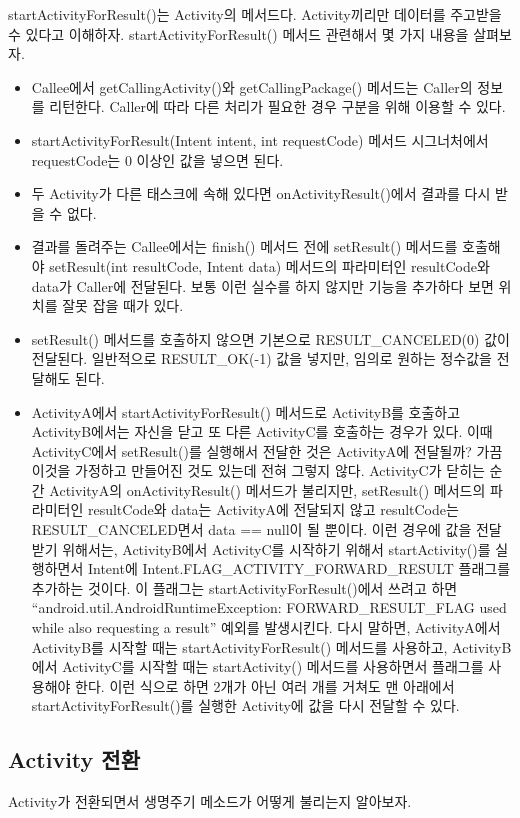 startActivityForResult()는 Activity의 메서드다. Activity끼리만 데이터를 주고받을 수 있다고 이해하자. 
startActivityForResult() 메서드 관련해서 몇 가지 내용을 살펴보자.
\begin{itemize} 
\item Callee에서 getCallingActivity()와 getCallingPackage() 메서드는 Caller의 정보를 리턴한다. Caller에 따라 다른 처리가 필요한 경우 구분을 위해 이용할 수 있다. 
\item startActivityForResult(Intent intent, int requestCode) 메서드 시그너처에서  requestCode는 0 이상인 값을 넣으면 된다.
\item 두 Activity가 다른 태스크에 속해 있다면 onActivityResult()에서 결과를 다시 받을 수 없다.
\item 결과를 돌려주는 Callee에서는 finish() 메서드 전에 setResult() 메서드를 호출해야 setResult(int resultCode, Intent data) 메서드의 파라미터인 resultCode와 data가 Caller에 전달된다. 보통 이런 실수를 하지 않지만 기능을 추가하다 보면 위치를 잘못 잡을 때가 있다.
\item setResult() 메서드를 호출하지 않으면 기본으로 RESULT\_CANCELED(0) 값이 전달된다. 일반적으로 RESULT\_OK(-1) 값을 넣지만, 임의로 원하는 정수값을 전달해도 된다.
\item ActivityA에서 startActivityForResult() 메서드로 ActivityB를 호출하고 ActivityB에서는 자신을 닫고 또 다른 ActivityC를 호출하는 경우가 있다. 
이때 ActivityC에서 setResult()를 실행해서 전달한 것은 ActivityA에 전달될까? 가끔 이것을 가정하고 만들어진 것도 있는데 전혀 그렇지 않다. 
ActivityC가 닫히는 순간 ActivityA의 onActivityResult() 메서드가 불리지만, setResult() 메서드의 파라미터인 resultCode와 data는 ActivityA에 전달되지 않고 resultCode는 RESULT\_CANCELED면서 data == null이 될 뿐이다.  이런 경우에 값을 전달받기 위해서는, ActivityB에서 ActivityC를 시작하기 위해서 startActivity()를 실행하면서 Intent에 Intent.FLAG\_ACTIVITY\_FORWARD\_RESULT 플래그를 추가하는 것이다.
이 플래그는 startActivityForResult()에서 쓰려고 하면 ``android.util.AndroidRuntimeExce\-ption: FORWARD\_RESULT\_F\-LAG used while also requesting a result''  예외를 발생시킨다. 
다시 말하면, ActivityA에서 ActivityB를 시작할 때는 startActivityForResult() 메서드를 사용하고, ActivityB에서 ActivityC를 시작할 때는 startActivity() 메서드를 사용하면서 플래그를 사용해야 한다. 
이런 식으로 하면 2개가 아닌 여러 개를 거쳐도 맨 아래에서 startActivityForResult()를 실행한 Activity에 값을 다시 전달할 수 있다.
\end{itemize}

\subsection{Activity 전환}
Activity가 전환되면서 생명주기 메소드가 어떻게 불리는지 알아보자.\\

